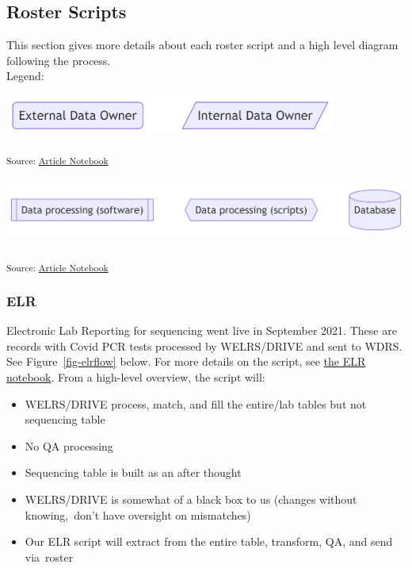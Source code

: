 \documentclass[
  letterpaper,
  DIV=11,
  numbers=noendperiod]{scrartcl}
\providecommand{\tightlist}{%
  \setlength{\itemsep}{0pt}\setlength{\parskip}{0pt}}\usepackage{longtable,booktabs,array}
\begin{document}
\subsection{Roster Scripts}\label{sec-ecosystem}

This section gives more details about each roster script and a high
level diagram following the process.\\

Legend:

\includegraphics[width=4.3in,height=0.52in]{index_files/figure-latex/mermaid-figure-18.png}

\textsubscript{Source:
\href{https://NW-PaGe.github.io/sequencing_integration_pipeline1.0/index.qmd.html}{Article
Notebook}}

\includegraphics[width=6.53in,height=0.83in]{index_files/figure-latex/mermaid-figure-17.png}

\textsubscript{Source:
\href{https://NW-PaGe.github.io/sequencing_integration_pipeline1.0/index.qmd.html}{Article
Notebook}}

\subsubsection{ELR}\label{sec-elr}

Electronic Lab Reporting for sequencing went live in September 2021.
These are records with Covid PCR tests processed by WELRS/DRIVE and sent
to WDRS\hspace{0pt}. See Figure~\ref{fig-elrflow} below. For more
details on the script, see \href{notebooks/elr.Rmd}{the ELR notebook}.
From a high-level overview, the script will:

\begin{itemize}
\tightlist
\item
  WELRS/DRIVE process, match, and fill the entire/lab tables but not
  sequencing table\hspace{0pt}
\item
  No QA processing\hspace{0pt}
\item
  Sequencing table is built as an after thought\hspace{0pt}
\item
  WELRS/DRIVE is somewhat of a black box to us (changes without
  knowing,~don't have oversight on mismatches)\hspace{0pt}
\item
  Our ELR script will extract from the entire table, transform, QA, and
  send via~roster\hspace{0pt}
\end{itemize}
\end{document}
